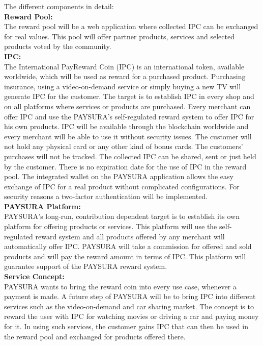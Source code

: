 \documentclass[twoside,onecolumn]{article}
\begin{document}
The different components in detail:\\


\textbf{Reward Pool:}\\
The reward pool will be a web application where collected IPC can be exchanged for real values. This pool will offer partner products, services and selected products voted by the community. \\


\textbf{IPC:}\\
The International PayReward Coin (IPC) is an international token, available worldwide, which will be used as reward for a purchased product. Purchasing insurance, using a video-on-demand service or simply buying a new TV will generate IPC for the customer. The target is to establish IPC in every shop and on all platforms where services or products are purchased. Every merchant can offer IPC and use the PAYSURA's self-regulated reward system to offer IPC for his own products. IPC will be available through the blockchain worldwide and every merchant will be able to use it without security issues. The customer will not hold any physical card or any other kind of bonus cards. The customers' purchases will not be tracked. The collected IPC can be shared, sent or just held by the customer. There is no expiration date for the use of IPC in the reward pool. The integrated wallet on the PAYSURA application allows the easy exchange of IPC for a real product without complicated configurations. For security reasons a two-factor authentication will be implemented. \\



\textbf{PAYSURA Platform:}\\
PAYSURA's long-run, contribution dependent target is to establish its own platform for offering products or services. This platform will use the self-regulated reward system and all products offered by any merchant will automatically offer IPC. PAYSURA will take a commission for offered and sold products and will pay the reward amount in terms of IPC. This platform will guarantee support of the PAYSURA reward system. \\



\textbf{Service Concept:}\\
PAYSURA wants to bring the reward coin into every use case, whenever a payment is made. A future step of PAYSURA will be to bring IPC into different services such as the video-on-demand and car sharing market. The concept is to reward the user with IPC for watching movies or driving a car and paying money for it. In using such services, the customer gains IPC that can then be used in the reward pool and exchanged for products offered there. \\
\end{document}
